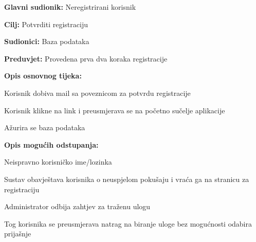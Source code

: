 					\noindent {}
					\begin{packed_item}
	
						\item \textbf{Glavni sudionik: }Neregistrirani korisnik
						\item  \textbf{Cilj:} Potvrditi registraciju
						\item  \textbf{Sudionici:} Baza podataka
						\item  \textbf{Preduvjet:} Provedena prva dva koraka registracije
						\item  \textbf{Opis osnovnog tijeka:} 
						
						
						\item[] \begin{packed_enum}
	
							\item Korisnik dobiva mail sa poveznicom za potvrdu registracije						
							\item Korisnik klikne na link i preusmjerava se na početno sučelje aplikacije
							\item Ažurira se baza podataka
							
						\end{packed_enum}
						
						\item  \textbf{Opis mogućih odstupanja:}
						
						\item[] \begin{packed_item}
	
							\item[2.a] Neispravno korisničko ime/lozinka
							\item[] \begin{packed_enum}
								
								\item Sustav obavještava korisnika o neuspjelom pokušaju i vraća ga na stranicu za registraciju 
								
							\end{packed_enum}
							\item[3.a] Administrator odbija zahtjev za traženu ulogu
							\item[] \begin{packed_enum}
								
								\item Tog korisnika se preusmjerava natrag na biranje uloge bez mogućnosti odabira prijašnje
								
							\end{packed_enum}

						\end{packed_item}
					\end{packed_item}

